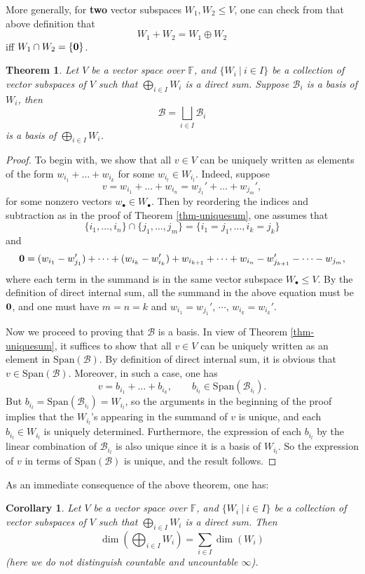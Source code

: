 \documentclass[11pt,openany]{book}
\theoremstyle{plain}
\newtheorem{theorem}{Theorem}[chapter]
\newtheorem{corollary}[corollary]{Corollary}
\theoremstyle{definition}
\theoremstyle{remark}
\begin{document}
\smallskip
More generally, for {\bf two} vector subspaces $W_1, W_2 \leq V$, one can check from that above definition that
$$W_1 + W_2 = W_1 \oplus W_2$$
iff $W_1 \cap W_2 = \{\bf 0\}$. 
\begin{theorem}
    Let $V$ be a vector space over $\mathbb{F}$, and $\{W_i\ |\ i \in I\}$ be a collection of vector subspaces of $V$ such that
    $\bigoplus_{i \in I} W_i$ is a direct sum. Suppose $\mathcal{B}_i$ is a basis of $W_i$, then $$\mathcal{B} = \bigsqcup_{i\in I} \mathcal{B}_i$$ is a basis of $\bigoplus_{i \in I} W_i$.
\end{theorem}
\begin{proof}
To begin with, we show that all $v \in V$ can be uniquely written as elements of the form $w_{i_1} + \dots + w_{i_k}$ for some $w_{i_l} \in W_{i_l}$. Indeed, suppose 
$$v = w_{i_1} + \dots + w_{i_n} = w_{j_1}' + \dots + w_{j_m}',$$
for some nonzero vectors $w_{\bullet} \in W_{\bullet}$. Then by reordering the indices and subtraction as in the proof of Theorem \ref{thm-uniquesum}, one assumes 
that 
$$\{i_1, \dots, i_n\} \cap \{j_1, \dots, j_m\} = \{i_1 = j_1, \dots, i_k = j_k\}$$ 
and
$${\bf 0} = (w_{i_1}-w_{j_1}') + \dots + (w_{i_k}-w_{i_k}') + w_{i_{k+1}} + \dots + w_{i_n} - w_{j_{k+1}}' - \dots - w_{j_m},$$
where each term in the summand is in the same vector subspace $W_{\bullet} \leq V$. By the definition of direct internal sum, all the summand in the above equation must be ${\bf 0}$, and one must have
$m = n = k$ and $w_{i_1} = w_{j_1}'$, $\cdots$, $w_{i_k} = w_{i_k}'$.

Now we proceed to proving that $\mathcal{B}$ is a basis. In view of Theorem \ref{thm-uniquesum}, it suffices to show that all $v \in V $ can be uniquely written as an element in $\mathrm{Span}(\mathcal{B})$. By definition of direct internal sum, it is obvious that $v \in \mathrm{Span}(\mathcal{B})$. Moreover, in such a case, one has
$$v = b_{i_1} + \dots + b_{i_k}, \quad \quad b_{i_l} \in \mathrm{Span}(\mathcal{B}_{i_l}).$$
But $b_{i_l} = \mathrm{Span}(\mathcal{B}_{i_l}) = W_{i_l}$, so the arguments in the beginning of the proof implies that the $W_{i_l}$'s appearing in the summand of $v$ is unique, and each $b_{i_l} \in W_{i_l}$ is uniquely determined. Furthermore, the expression of each $b_{i_l}$ by the linear combination of $\mathcal{B}_{i_l}$ is also unique since it is a basis of $W_{i_l}$. So the expression of $v$ in terms of $\mathrm{Span}(\mathcal{B})$ is unique, and the result follows.
\end{proof}

As an immediate consequence of the above theorem, one has:
\begin{corollary}
 Let $V$ be a vector space over $\mathbb{F}$, and $\{W_i\ |\ i \in I\}$ be a collection of vector subspaces of $V$ such that $\bigoplus_{i \in I} W_i$ is a direct sum. Then
    $$\dim\left(\bigoplus_{i \in I} W_i\right) = \sum_{i \in I} \dim(W_i)$$
    (here we do not distinguish countable and uncountable $\infty$).
\end{corollary}
\end{document}
